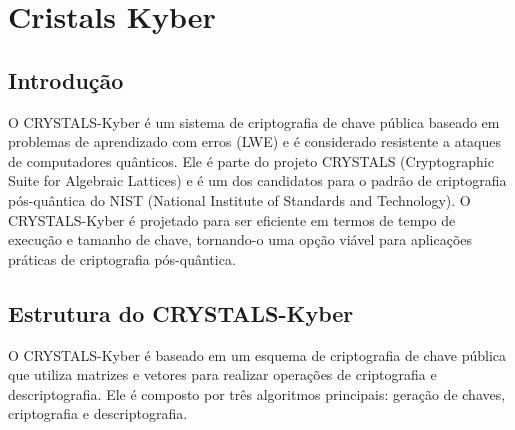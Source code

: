\chapter{Cristals Kyber}
\section{Introdução}



O CRYSTALS-Kyber é um sistema de criptografia de chave pública baseado em problemas de aprendizado com erros (LWE) e é considerado resistente a ataques de computadores quânticos. 
Ele é parte do projeto CRYSTALS (Cryptographic Suite for Algebraic Lattices) e é um dos candidatos para o padrão de criptografia pós-quântica do NIST (National Institute of Standards and Technology). O CRYSTALS-Kyber é projetado para ser eficiente em termos de tempo de execução e tamanho de chave, tornando-o uma opção viável para aplicações práticas de criptografia pós-quântica.
\section{Estrutura do CRYSTALS-Kyber}
O CRYSTALS-Kyber é baseado em um esquema de criptografia de chave pública que utiliza matrizes e vetores para realizar operações de criptografia e descriptografia. Ele é composto por três algoritmos principais: geração de chaves, criptografia e descriptografia.